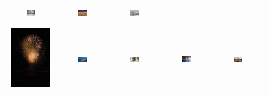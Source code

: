 \begin{figure}[th]
{{\begin{center}
\begin{tabular}{@{}c@{\,\,\,}c@{\,\,\,}c@{\,\,\,}c@{\,\,\,}c@{\,\,\,}}
\includegraphics[width=0.19\textwidth]{imggrid/datasetnega/3.jpg} &
\includegraphics[width=0.19\textwidth]{imggrid/datasetnega/4.jpg} &
\includegraphics[width=0.19\textwidth]{imggrid/datasetnega/5.jpg} \\
\\[-6pt]
\hline
\\[-6pt]
\includegraphics[height=1in]{imggrid/datasetnega/6.jpg} &
\includegraphics[width=0.19\textwidth]{imggrid/datasetnega/7.jpg} &
\includegraphics[width=0.19\textwidth]{imggrid/datasetnega/8.jpg} &
\includegraphics[width=0.19\textwidth]{imggrid/datasetnega/9.jpg} &
\includegraphics[width=0.19\textwidth]{imggrid/datasetnega/10.jpg} \\

\end{tabular}
\end{center}}}
\end{figure}
